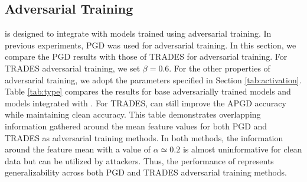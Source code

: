\documentclass[conference]{IEEEtran}
\begin{document}
\subsection{Adversarial Training}\label{abl:adv_tr}
\sys is designed to integrate with models trained using adversarial training. In previous experiments, PGD \cite{tdlmm18} was used for adversarial training. In this section, we compare the PGD results with those of TRADES \cite{zhang2019theoretically} for adversarial training. For TRADES adversarial training, we set $\beta = 0.6$. For the other properties of adversarial training, we adopt the parameters specified in Section \ref{tab:activation}. Table \ref{tab:type} compares the results for base adversarially trained models and models integrated with \sys. For TRADES, \sys can still improve the APGD accuracy while maintaining clean accuracy. This table demonstrates overlapping information gathered around the mean feature values for both PGD and TRADES as adversarial training methods. In both methods, the information around the feature mean with a value of $\alpha\simeq 0.2$ is almost uninformative for clean data but can be utilized by attackers. Thus, the performance of \sys represents generalizability across both PGD and TRADES adversarial training methods.
\end{document}
